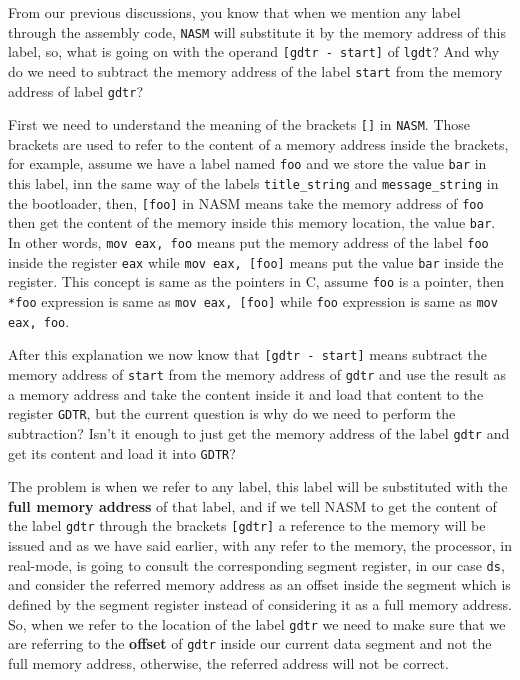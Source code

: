 From our previous discussions, you know that when we mention any label
through the assembly code, \lstinline!NASM! will substitute it by the
memory address of this label, so, what is going on with the operand
\lstinline![gdtr - start]! of \lstinline!lgdt!? And why do we need to
subtract the memory address of the label \lstinline!start! from the
memory address of label \lstinline!gdtr!?

First we need to understand the meaning of the brackets \lstinline![]!
in \lstinline!NASM!. Those brackets are used to refer to the content of
a memory address inside the brackets, for example, assume we have a
label named \lstinline!foo! and we store the value \lstinline!bar! in
this label, inn the same way of the labels \lstinline!title_string! and
\lstinline!message_string! in the bootloader, then, \lstinline![foo]! in
NASM means take the memory address of \lstinline!foo! then get the
content of the memory inside this memory location, the value
\lstinline!bar!. In other words, \lstinline!mov eax, foo! means put the
memory address of the label \lstinline!foo! inside the register
\lstinline!eax! while \lstinline!mov eax, [foo]! means put the value
\lstinline!bar! inside the register. This concept is same as the
pointers in C, assume \lstinline!foo! is a pointer, then
\lstinline!*foo! expression is same as \lstinline!mov eax, [foo]! while
\lstinline!foo! expression is same as \lstinline!mov eax, foo!.

After this explanation we now know that \lstinline![gdtr - start]! means
subtract the memory address of \lstinline!start! from the memory address
of \lstinline!gdtr! and use the result as a memory address and take the
content inside it and load that content to the register
\lstinline!GDTR!, but the current question is why do we need to perform
the subtraction? Isn't it enough to just get the memory address of the
label \lstinline!gdtr! and get its content and load it into
\lstinline!GDTR!?

The problem is when we refer to any label, this label will be
substituted with the \textbf{full memory address} of that label, and if
we tell NASM to get the content of the label \lstinline!gdtr! through
the brackets \lstinline![gdtr]! a reference to the memory will be issued
and as we have said earlier, with any refer to the memory, the
processor, in real-mode, is going to consult the corresponding segment
register, in our case \lstinline!ds!, and consider the referred memory
address as an offset inside the segment which is defined by the segment
register instead of considering it as a full memory address. So, when we
refer to the location of the label \lstinline!gdtr! we need to make sure
that we are referring to the \textbf{offset} of \lstinline!gdtr! inside
our current data segment and not the full memory address, otherwise, the
referred address will not be correct.

